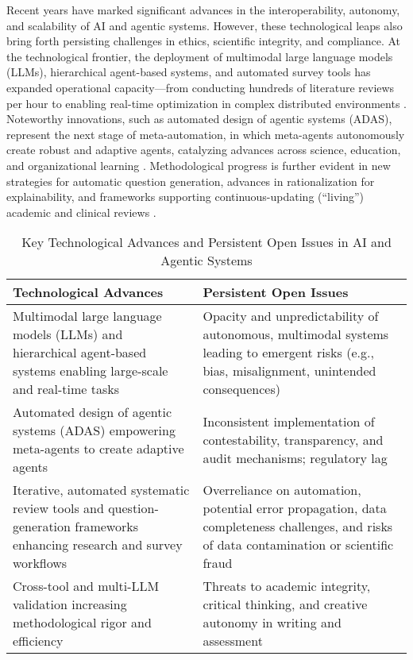 \documentclass[11pt]{article}
\begin{document}
Recent years have marked significant advances in the interoperability, autonomy, and scalability of AI and agentic systems. However, these technological leaps also bring forth persisting challenges in ethics, scientific integrity, and compliance. At the technological frontier, the deployment of multimodal large language models (LLMs), hierarchical agent-based systems, and automated survey tools has expanded operational capacity—from conducting hundreds of literature reviews per hour to enabling real-time optimization in complex distributed environments \cite{31,47,49,74,80,84,100,102,104}. Noteworthy innovations, such as automated design of agentic systems (ADAS), represent the next stage of meta-automation, in which meta-agents autonomously create robust and adaptive agents, catalyzing advances across science, education, and organizational learning \cite{31,34,35,47,49}. Methodological progress is further evident in new strategies for automatic question generation, advances in rationalization for explainability, and frameworks supporting continuous-updating (“living”) academic and clinical reviews \cite{74,84,100,102,104}.

\begin{table}[htbp]
\centering
\caption{Key Technological Advances and Persistent Open Issues in AI and Agentic Systems}
\label{tab:advances_issues}
\begin{tabular}{|p{5cm}|p{5cm}|}
\hline
\textbf{Technological Advances} & \textbf{Persistent Open Issues} \\ \hline
Multimodal large language models (LLMs) and hierarchical agent-based systems enabling large-scale and real-time tasks & Opacity and unpredictability of autonomous, multimodal systems leading to emergent risks (e.g., bias, misalignment, unintended consequences) \\ \hline
Automated design of agentic systems (ADAS) empowering meta-agents to create adaptive agents & Inconsistent implementation of contestability, transparency, and audit mechanisms; regulatory lag \\ \hline
Iterative, automated systematic review tools and question-generation frameworks enhancing research and survey workflows & Overreliance on automation, potential error propagation, data completeness challenges, and risks of data contamination or scientific fraud \\ \hline
Cross-tool and multi-LLM validation increasing methodological rigor and efficiency & Threats to academic integrity, critical thinking, and creative autonomy in writing and assessment \\ \hline
\end{tabular}
\end{table}
\end{document}
